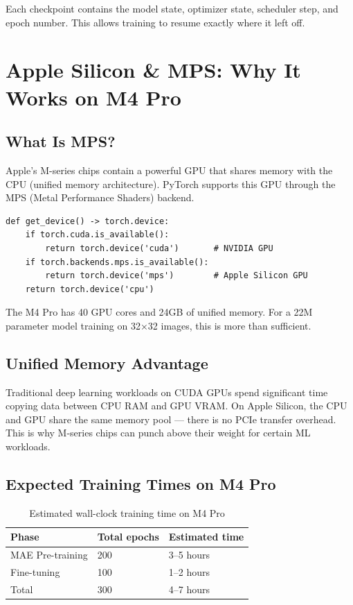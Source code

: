 \documentclass[12pt, a4paper]{report}
\begin{document}
Each checkpoint contains the model state, optimizer state, scheduler step, and epoch number. This allows training to resume exactly where it left off.

\chapter{Apple Silicon \& MPS: Why It Works on M4 Pro}

\section{What Is MPS?}

Apple's M-series chips contain a powerful GPU that shares memory with the CPU (unified memory architecture). PyTorch supports this GPU through the MPS (Metal Performance Shaders) backend.

\begin{lstlisting}[caption=Device selection in our code]
def get_device() -> torch.device:
    if torch.cuda.is_available():
        return torch.device('cuda')       # NVIDIA GPU
    if torch.backends.mps.is_available():
        return torch.device('mps')        # Apple Silicon GPU
    return torch.device('cpu')
\end{lstlisting}

The M4 Pro has 40 GPU cores and 24GB of unified memory. For a 22M parameter model training on 32×32 images, this is more than sufficient.

\section{Unified Memory Advantage}

Traditional deep learning workloads on CUDA GPUs spend significant time copying data between CPU RAM and GPU VRAM. On Apple Silicon, the CPU and GPU share the same memory pool — there is no PCIe transfer overhead. This is why M-series chips can punch above their weight for certain ML workloads.

\section{Expected Training Times on M4 Pro}

\begin{table}[H]
\centering
\begin{tabular}{lll}
\toprule
\textbf{Phase} & \textbf{Total epochs} & \textbf{Estimated time} \\
\midrule
MAE Pre-training & 200 & 3–5 hours \\
Fine-tuning & 100 & 1–2 hours \\
Total & 300 & 4–7 hours \\
\bottomrule
\end{tabular}
\caption{Estimated wall-clock training time on M4 Pro}
\end{table}
\end{document}
